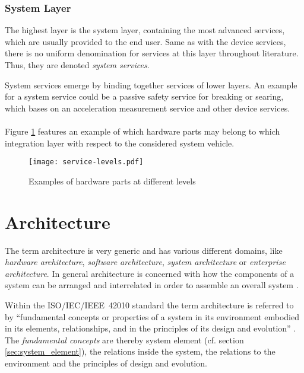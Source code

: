 \subsubsection{System Layer}
The highest layer is the system layer, containing the most advanced services, which are usually provided to the end user. Same as with the device services, there is no uniform denomination for services at this layer throughout literature. Thus, they are denoted \emph{system services}.

System services emerge by binding together services of lower layers. An example for a system service could be a passive safety service for breaking or searing, which bases on an acceleration measurement service and other device services.
\\
\\
Figure \ref{fig:service_levels} features an example of which hardware parts may belong to which integration layer with respect to the considered system vehicle. 


\begin{figure}[!htbp]
\centering
\texttt{[image: service-levels.pdf]}
\caption{Examples of hardware parts at different levels \cite{avl}}
\label{fig:service_levels}
\end{figure}









\section{Architecture}

\label{ch:architecture}

The term architecture is very generic and has various different domains, like \emph{hardware architecture}, \emph{software architecture}, \emph{system architecture} or \emph{enterprise architecture}. In general architecture is concerned with how the components of a system can be arranged and interrelated in order to assemble an overall system \cite{ISO_42010} \cite{ning}. 

Within the \mbox{ISO/IEC/IEEE 42010} standard the term architecture is referred to by ``fundamental concepts or properties of a system in its environment embodied in its elements, relationships, and in the principles of its design and evolution'' \cite{ISO_42010}. The \emph{fundamental concepts} are thereby system element (cf. section \ref{sec:system_element}), the relations inside the system, the relations to the environment and the principles of design and evolution.


